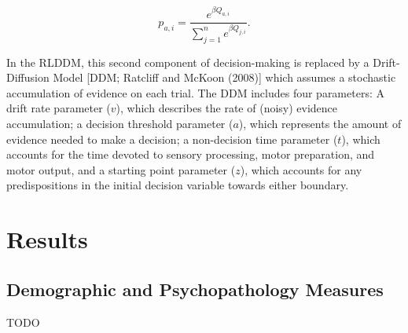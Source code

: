 \documentclass[
  man,floatsintext]{apa6}
\begin{document}
\[
p_{a,i} = \frac{e^{\beta Q_{a,i}}}{\sum_{j=1}^n e^{\beta Q_{j,i}}}.
\]

In the RLDDM, this second component of decision-making is replaced by a Drift-Diffusion Model {[}DDM; Ratcliff and McKoon (2008){]} which assumes a stochastic accumulation of evidence on each trial. The DDM includes four parameters: A drift rate parameter (\(v\)), which describes the rate of (noisy) evidence accumulation; a decision threshold parameter (\(a\)), which represents the amount of evidence needed to make a decision; a non-decision time parameter (\(t\)), which accounts for the time devoted to sensory processing, motor preparation, and motor output, and a starting point parameter (\(z\)), which accounts for any predispositions in the initial decision variable towards either boundary.

\hypertarget{results}{%
\section{Results}\label{results}}

\hypertarget{demographic-and-psychopathology-measures}{%
\subsection{Demographic and Psychopathology Measures}\label{demographic-and-psychopathology-measures}}

TODO
\end{document}
